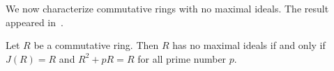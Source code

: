 

We now characterize commutative rings with no maximal ideals.
The result appeared in~\cite{MR0424776}. 

\begin{theorem}[Henriksen]
\label{thm:Henriksen}
Let $R$ be a commutative ring. Then $R$ has
no maximal ideals if and only if 
$J(R)=R$ and $R^2+pR=R$ for all prime number $p$. 
\end{theorem}

